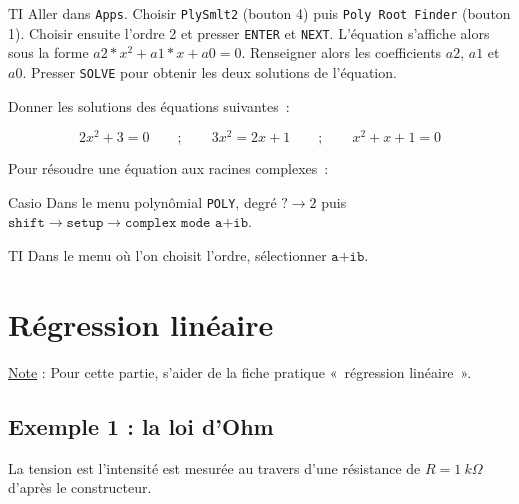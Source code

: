 \documentclass[a4paper, 12pt, final, garamond]{book}
\begin{document}
\begin{instruc}{TI}
    Aller dans \texttt{Apps}. Choisir \texttt{PlySmlt2} (bouton 4) puis
    \texttt{Poly Root Finder} (bouton 1). Choisir ensuite l'ordre 2 et presser
    \texttt{ENTER} et \texttt{NEXT}. L'équation s'affiche alors sous la forme
    $a2*x^2+a1*x+a0=0$. Renseigner alors les coefficients $a2$, $a1$ et $a0$.
    Presser \texttt{SOLVE} pour obtenir les deux solutions de l'équation.
\end{instruc}

Donner les solutions des équations suivantes~: 

\[2x^2+3 = 0 \qquad ; \qquad 3x^2 = 2x+1 \qquad;\qquad x^2+x+1 = 0\]

\vspace{2cm}

Pour résoudre une équation aux racines complexes~:

\begin{instruc}{Casio}
    Dans le menu polynômial \texttt{POLY}, degré $? \rightarrow
    2$ puis $\texttt{shift} \rightarrow \texttt{setup} \rightarrow
    \texttt{complex mode a+ib}$.
\end{instruc}

\begin{instruc}{TI}
    Dans le menu où l'on choisit l'ordre, sélectionner $\texttt{a+ib}$.
\end{instruc}

\section{Régression linéaire}

\underline{Note} : Pour cette partie, s'aider de la fiche pratique «~régression
linéaire~».

\subsection{Exemple 1 : la loi d'Ohm}

La tension est l'intensité est mesurée au travers d'une résistance de $R=
\SI{1}{k\Omega}$ d'après le constructeur. 

 
\end{document}
